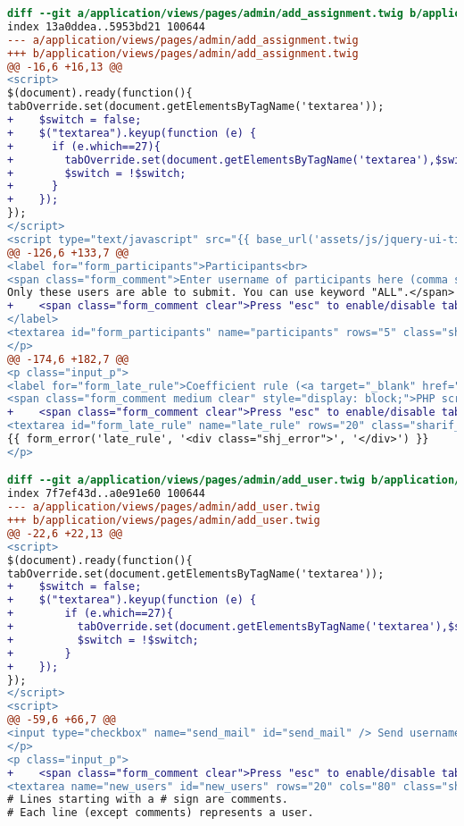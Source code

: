 \begin{lstlisting}[language=diff, caption=Perubahan untuk mematuhi kriteria 2.1.2, label=lst_2.1.2, basicstyle=\ttfamily, frame=single,
columns=fullflexible, keepspaces=true, breaklines=true]
diff --git a/application/views/pages/admin/add_assignment.twig b/application/views/pages/admin/add_assignment.twig
index 13a0ddea..5953bd21 100644
--- a/application/views/pages/admin/add_assignment.twig
+++ b/application/views/pages/admin/add_assignment.twig
@@ -16,6 +16,13 @@
<script>
$(document).ready(function(){
tabOverride.set(document.getElementsByTagName('textarea'));
+    $switch = false;
+    $("textarea").keyup(function (e) {
+      if (e.which==27){
+        tabOverride.set(document.getElementsByTagName('textarea'),$switch);
+        $switch = !$switch;
+      }
+    });
});
</script>
<script type="text/javascript" src="{{ base_url('assets/js/jquery-ui-timepicker-addon.js') }}"></script>
@@ -126,6 +133,7 @@
<label for="form_participants">Participants<br>
<span class="form_comment">Enter username of participants here (comma separated).
Only these users are able to submit. You can use keyword "ALL".</span>
+    <span class="form_comment clear">Press "esc" to enable/disable tabindent</span>
</label>
<textarea id="form_participants" name="participants" rows="5" class="sharif_input medium">{{ edit ? edit_assignment.participants : set_value('participants', 'ALL') }}</textarea>
</p>
@@ -174,6 +182,7 @@
<p class="input_p">
<label for="form_late_rule">Coefficient rule (<a target="_blank" href="https://github.com/ifunpar/Sharif-Judge/blob/docs/v1.4/add_assignment.md#coefficient-rule">?</a>)</label><br>
<span class="form_comment medium clear" style="display: block;">PHP script without &lt;?php ?&gt; tags</span>
+    <span class="form_comment clear">Press "esc" to enable/disable tabindent</span><br>
<textarea id="form_late_rule" name="late_rule" rows="20" class="sharif_input add_text">{{ edit ? edit_assignment.late_rule : set_value('late_rule', default_late_rule) }}</textarea>
{{ form_error('late_rule', '<div class="shj_error">', '</div>') }}
</p>

diff --git a/application/views/pages/admin/add_user.twig b/application/views/pages/admin/add_user.twig
index 7f7ef43d..a0e91e60 100644
--- a/application/views/pages/admin/add_user.twig
+++ b/application/views/pages/admin/add_user.twig
@@ -22,6 +22,13 @@
<script>
$(document).ready(function(){
tabOverride.set(document.getElementsByTagName('textarea'));
+    $switch = false;
+    $("textarea").keyup(function (e) {
+        if (e.which==27){
+          tabOverride.set(document.getElementsByTagName('textarea'),$switch);
+          $switch = !$switch;
+        }
+    });
});
</script>
<script>
@@ -59,6 +66,7 @@
<input type="checkbox" name="send_mail" id="send_mail" /> Send usernames and passwords by email (Waits <input type="text" name="delay" id="delay" class="sharif_input tiny" value="2"/> second(s) before sending each email, so please be patient).
</p>
<p class="input_p">
+    <span class="form_comment clear">Press "esc" to enable/disable tabindent</span><br>
<textarea name="new_users" id="new_users" rows="20" cols="80" class="sharif_input">
# Lines starting with a # sign are comments.
# Each line (except comments) represents a user.


\end{lstlisting}
